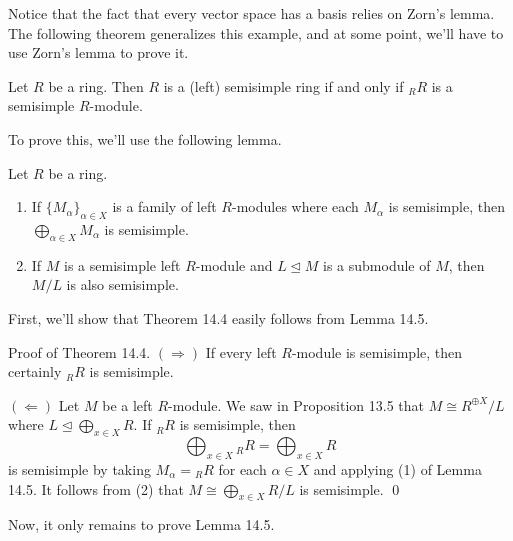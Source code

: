 Notice that the fact that every vector space has a basis relies on Zorn's lemma. 
The following theorem generalizes this example, and at some point, we'll have to use 
Zorn's lemma to prove it. 

\begin{thm}
    Let $R$ be a ring. Then $R$ is a (left) semisimple ring if and only if 
    ${}_R R$ is a semisimple $R$-module. 
\end{thm}

To prove this, we'll use the following lemma. 

\begin{lemma}
    Let $R$ be a ring. 
    \begin{enumerate}[(1)]
        \item If $\{M_\alpha\}_{\alpha \in X}$ is a family of left $R$-modules 
        where each $M_\alpha$ is semisimple, then $\bigoplus_{\alpha \in X} 
        M_\alpha$ is semisimple. 
        \item If $M$ is a semisimple left $R$-module and $L \trianglelefteq M$ 
        is a submodule of $M$, then $M/L$ is also semisimple. 
    \end{enumerate}
\end{lemma}

First, we'll show that Theorem 14.4 easily follows from Lemma 14.5. 

{\sc Proof of Theorem 14.4.} $(\Rightarrow)$ If every left $R$-module is semisimple, 
then certainly ${}_R R$ is semisimple. 

$(\Leftarrow)$ Let $M$ be a left $R$-module. We saw in Proposition 13.5 that 
$M \cong R^{\oplus X}/L$ where $L \trianglelefteq \bigoplus_{x \in X} R$. 
If ${}_R R$ is semisimple, then 
\[ \bigoplus_{x \in X} {}_R R = \bigoplus_{x \in X} R \] 
is semisimple by taking $M_\alpha = {}_R R$ for each $\alpha \in X$ and 
applying (1) of Lemma 14.5. It follows from (2) that $M \cong 
\bigoplus_{x \in X} R/L$ is semisimple. \qed 

Now, it only remains to prove Lemma 14.5. 

